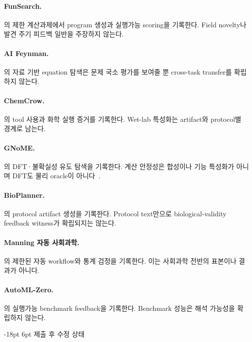\documentclass[11pt]{article}
\makeatletter
\renewcommand\section{\@startsection{section}{1}{\z@}%
  {-18pt \@plus -4pt \@minus -2pt}%
  {6pt \@plus 2pt}%
  {\normalfont\large\bfseries}}
\makeatother
\begin{document}
\paragraph{FunSearch.} \citet{romera2023funsearch}의 제한 계산과제에서 program 생성과 실행가능 scoring을 기록한다. Field novelty나 발견 주기 피드백 일반을 주장하지 않는다.

\paragraph{AI Feynman.} \citet{udrescu2020afeynman}의 자료 기반 equation 탐색은 문제 국소 평가를 보여줄 뿐 cross-task transfer를 확립하지 않는다.

\paragraph{ChemCrow.} \citet{bran2023chemcrow}의 tool 사용과 화학 실행 증거를 기록한다. Wet-lab 특성화는 artifact와 protocol별 경계로 남는다.

\paragraph{GNoME.} \citet{merchant2023gnome}의 DFT·불확실성 유도 탐색을 기록한다. 계산 안정성은 합성이나 기능 특성화가 아니며 DFT도 물리 oracle이 아니다~\citep{cheetham2024gnome}.

\paragraph{BioPlanner.} \citet{odonoghue2023bioplanner}의 protocol artifact 생성을 기록한다. Protocol text만으로 biological-validity feedback witness가 확립되지는 않는다.

\paragraph{Manning 자동 사회과학.} \citet{manning2024automated}의 제한된 자동 workflow와 통계 검정을 기록한다. 이는 사회과학 전반의 표본이나 결과가 아니다.

\paragraph{AutoML-Zero.} \citet{real2020automlzero}의 실행가능 benchmark feedback을 기록한다. Benchmark 성능은 해석 가능성을 확립하지 않는다.

\section{제출 후 수정 상태}
\label{app:postsubmit}
\end{document}
